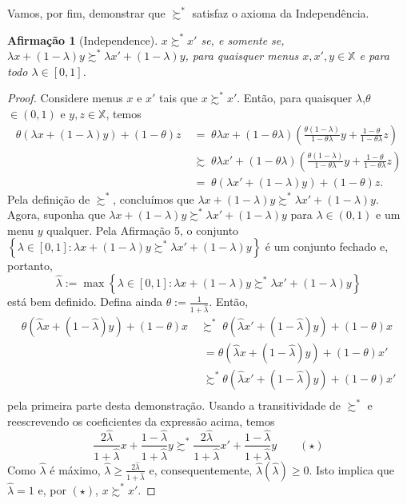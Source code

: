 \documentclass[11pt, a4paper]{article}
\theoremstyle{nonumberplain}
\newtheorem{proof}{Dem.}
\theoremstyle{plain}
\theoremstyle{plain}
\newtheorem{claim}{Afirmação}
\theoremstyle{plain}
\theoremstyle{nonumberplain}
\begin{document}
Vamos, por fim, demonstrar que $\succsim^*$ satisfaz o axioma da Independência.
\begin{claim}[Independence] $x\succsim^*x'$ se, e somente se, $\lambda x + (1-\lambda)y\succsim^* \lambda x' + (1-\lambda)y$, para quaisquer menus $x,x',y\in \mathbb{X}$ e para todo $\lambda \in [0,1]$.\end{claim}
\begin{proof}
Considere menus $x$ e $x'$ tais que $x\succsim^* x'$. Então, para quaisquer $\lambda$,$\theta$ $\in (0,1)$ e $y,z\in\mathbb{X}$, temos
\begin{align*}
\theta(\lambda x + (1-\lambda)y)+(1-\theta)z \;&=\; \theta\lambda x + (1-\theta\lambda)\left(\frac{\theta(1-\lambda)}{1-\theta\lambda}y+\frac{1-\theta}{1-\theta\lambda}z\right)\\
&\succsim\; \theta\lambda x' + (1-\theta\lambda)\left(\frac{\theta(1-\lambda)}{1-\theta\lambda}y+\frac{1-\theta}{1-\theta\lambda}z\right)\\
&=\; \theta(\lambda x' + (1-\lambda)y)+(1-\theta)z.
\end{align*}
Pela definição de $\succsim^*$, concluímos que $\lambda x + (1-\lambda)y\succsim^*\lambda x' + (1-\lambda)y$.
Agora, suponha que $\lambda x + (1-\lambda)y\succsim^*\lambda x' + (1-\lambda)y$ para $\lambda\in(0,1)$ e um menu $y$ qualquer. Pela Afirmação 5, o conjunto $\left\{\lambda\in[0,1]:\lambda x + (1-\lambda)y\succsim^*\lambda x' + (1-\lambda)y\right\}$ é um conjunto fechado e, portanto, $$\hat{\lambda}:=\max\left\{\lambda\in[0,1]:\lambda x + (1-\lambda)y\succsim^*\lambda x' + (1-\lambda)y\right\}$$ está bem definido. Defina ainda $\theta:=\frac{1}{1+\hat{\lambda}}$. Então,
\begin{align*}
\theta(\hat{\lambda}x+(1-\hat{\lambda})y)+(1-\theta)x\;&\succsim^*\;\theta(\hat{\lambda}x'+(1-\hat{\lambda})y)+(1-\theta)x\\
&\;= \theta(\hat{\lambda}x+(1-\hat{\lambda})y)+(1-\theta)x'\\
&\;\succsim^* \theta(\hat{\lambda}x'+(1-\hat{\lambda})y)+(1-\theta)x'\\
\end{align*} pela primeira parte desta demonstração. Usando a transitividade de $\succsim^*$ e reescrevendo os coeficientes da expressão acima, temos $$\frac{2\hat{\lambda}}{1+\hat{\lambda}}x+\frac{1-\hat{\lambda}}{1+\hat{\lambda}}y \succsim^* \frac{2\hat{\lambda}}{1+\hat{\lambda}}x'+\frac{1-\hat{\lambda}}{1+\hat{\lambda}}y \qquad (\star)$$ Como $\hat{\lambda}$ é máximo, $\hat{\lambda}\geq \frac{2\hat{\lambda}}{1+\hat{\lambda}}$ e, consequentemente, $\hat{\lambda}(\hat{\lambda})\geq 0$. Isto implica que $\hat{\lambda}=1$ e, por $(\star)$, $x\succsim^* x'$.
\end{proof}
\end{document}

